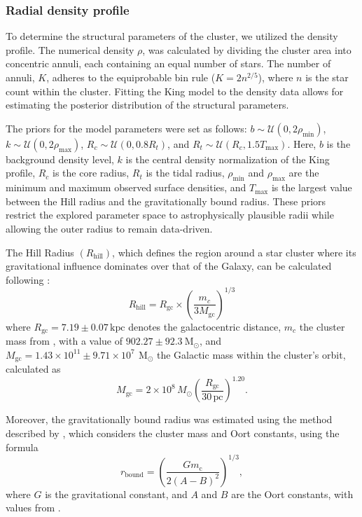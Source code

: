 \documentclass{aa}
\begin{document}
\subsubsection{Radial density profile}
To determine the structural parameters of the cluster, we utilized the \citet{1962AJ.....67..471K} density profile. The numerical density $\rho$, was calculated by dividing the cluster area into concentric annuli, each containing an equal number of stars. The number of annuli, $K$, adheres to the equiprobable bin rule ($K = 2n^{2/5}$), where $n$ is the star count within the cluster. Fitting the King model to the density data allows for estimating the posterior distribution of the structural parameters.

The priors for the model parameters were set as follows: $b \sim \mathcal{U}(0, 2\rho_{\mathrm{min}})$, $k \sim \mathcal{U}(0, 2\rho_{\mathrm{max}})$, $R_c \sim \mathcal{U}(0, 0.8R_t)$, and $R_t \sim \mathcal{U}(R_c, 1.5T_{\mathrm{max}})$. Here, $b$ is the background density level, $k$ is the central density normalization of the King profile, $R_c$ is the core radius, $R_t$ is the tidal radius, $\rho_{\mathrm{min}}$ and $\rho_{\mathrm{max}}$ are the minimum and maximum observed surface densities, and $T_{\mathrm{max}}$ is the largest value between the Hill radius and the gravitationally bound radius. These priors restrict the explored parameter space to astrophysically plausible radii while allowing the outer radius to remain data-driven.

The Hill Radius $(R_\mathrm{hill})$, which defines the region around a star cluster where its gravitational influence dominates over that of the Galaxy, can be calculated following \citet{2019A&A...627A.119C}:
\begin{equation}
R_\mathrm{hill} = R_{\mathrm{gc}} \times \left(\frac{m_c}{3M_{\mathrm{gc}}}\right)^{1/3}
\end{equation}
where $ R_{\mathrm{gc}} = 7.19 \pm 0.07\,\mathrm{kpc} $ denotes the galactocentric distance, $ m_c $ the cluster mass from \citet{2024arXiv240305143H}, with a value of $902.27 \pm 92.3~\mathrm{M_{\odot}}$, and $ M_{\mathrm{gc}} = 1.43 \times 10^{11} \pm 9.71 \times 10^7\,~\mathrm{M_{\odot}} $ the Galactic mass within the cluster's orbit, calculated as
\begin{equation}
	M_{\mathrm{gc}} = 2  \times 10^8\,M_\odot \left(\frac{R_{\mathrm{gc}}}{30\,\mathrm{pc}}\right)^{1.20}.
\end{equation}

Moreover, the gravitationally bound radius was estimated using the method described by \citet{1998MNRAS.299..955P}, which considers the cluster mass and Oort constants, using the formula
\begin{equation}
	r_\mathrm{bound} = \left( \frac{Gm_{\mathrm{c}}}{2(A-B)^2} \right)^{1/3},
\end{equation}
where $G$ is the gravitational constant, and $A$ and $B$ are the Oort constants, with values from \citet{2017MNRAS.468L..63B}.
\end{document}
